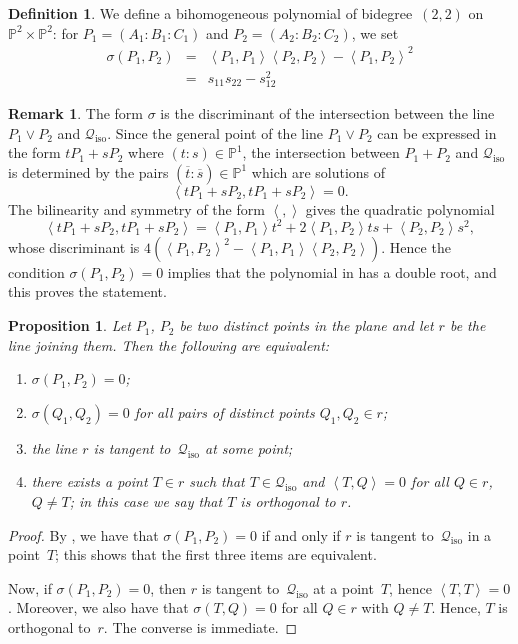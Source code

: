 \documentclass{amsart}
\theoremstyle{plain}
\newtheorem{prop}[lemma]{Proposition}
\theoremstyle{definition}
\newtheorem{definition}[lemma]{Definition}
\newtheorem{rmk}[lemma]{Remark}
\newcommand{\p}{\mathbb{P}}
\newcommand{\iso}{\mathcal{Q}_{\mathrm{iso}}}
\newcommand{\scl}[2]{\left\langle {#1}, {#2} \right\rangle}
\begin{document}
\begin{definition}
\label{definition:sigma}
We define a bihomogeneous polynomial of bidegree~$(2,2)$ on $\p^2 \times \p^2$: for $P_1 = (A_1: B_1: C_1)$ and $P_2 = (A_2: B_2: C_2)$, we set
%
\begin{eqnarray}
\label{formula:sigma}
  \sigma(P_1, P_2) &=& \scl{P_1}{P_1} \scl{P_2}{P_2} - \scl{P_1}{P_2}^2 \\
   & = & s_{11}s_{22}-s_{12}^2
\end{eqnarray}
\end{definition}

\begin{rmk}\label{rmk:sigma_discr}
The form $\sigma$ is the discriminant of the intersection between the line $P_1 \vee P_2$ and $\iso$.
Since the general point of the line $P_1 \vee P_2$ can be expressed in the form
$t P_1 + sP_2$ where $(t:s) \in \p^1$, the intersection between $P_1+P_2$
and $\iso$ is determined by the pairs $( \overline t: \overline s)\in \p^1$ which are solutions of
$$
\scl{t P_1 + sP_2}{t P_1 + sP_2} =0.
$$
The bilinearity and symmetry of the form $\scl{}{}$ gives the quadratic polynomial
\begin{equation}\label{eq:intersection_isotropic}
\scl{t P_1 + sP_2}{t P_1 + sP_2}= \scl{P_1}{P_1} t^2
+2\scl{P_1}{P_2} ts + \scl{P_2}{P_2}s^2,
\end{equation}
whose discriminant is $4 ( \scl{P_1}{P_2}^2 - \scl{P_1}{P_1} \scl{P_2}{P_2})$.
Hence the condition $\sigma(P_1,P_2)=0$ implies that the polynomial in 
has a double root, and this proves the statement.
\end{rmk}

\begin{prop}
\label{proposition:sigma_tangency}
  Let $P_1$, $P_2$ be two distinct points in the plane and let $r$ be the line joining them.
  Then the following are equivalent:
  \begin{enumerate}
  \item $\sigma(P_1, P_2) = 0$;
  \item $\sigma(Q_1, Q_2) = 0$ for all pairs of distinct points $Q_1, Q_2 \in r$;
  \item the line $r$ is tangent to~$\iso$ at some point;
  \item there exists a point $T \in r$ such that $T \in \iso$ and $\scl{T}{Q} = 0$ for all $Q \in r$, $Q \neq T$; in this case we say that $T$ is \emph{orthogonal} to $r$.
  \end{enumerate}
\end{prop}
\begin{proof}
  By , we have that $\sigma(P_1, P_2) = 0$ if and only if $r$ is tangent to~$\iso$ in a point~$T$; this shows that the first three items are equivalent.

  Now, if $\sigma(P_1, P_2) = 0$, then $r$ is tangent to~$\iso$ at a point~$T$, hence $\scl{T}{T} = 0$. Moreover, we also have that $\sigma(T, Q) = 0$ for all $Q \in r$ with $Q \neq T$. Hence, $T$ is orthogonal to~$r$.
  The converse is immediate.
\end{proof}
\end{document}
